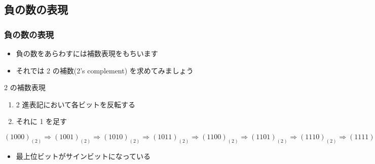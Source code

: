 \subsection{負の数の表現}
\begin{frame}[shrink]
\frametitle{負の数の表現}
  \begin{itemize}
\item 負の数をあらわすには補数表現をもちいます
\item それでは 2 の補数(2's complement) を求めてみましょう
  \end{itemize}
  \begin{block}{2 の補数表現}
    \begin{enumerate}
\item 2 進表記において各ビットを反転する
\item それに 1 を足す
    \end{enumerate}
  \end{block}
  \begin{center}
    \begin{example}
\((1000)_{(2)}\Rightarrow(1001)_{(2)}\Rightarrow(1010)_{(2)}\Rightarrow (1011)_{(2)}\Rightarrow (1100)_{(2)}
\Rightarrow(1101)_{(2)}\Rightarrow(1110)_{(2)}\Rightarrow(1111)_{(2)}
\Rightarrow(0000)_{(2)}\Rightarrow(0001)_{(2)}\Rightarrow(0010)_{(2)}\Rightarrow(0011)_{(2)}
\Rightarrow(0100)_{(2)}\Rightarrow(0101)_{(2)}\Rightarrow(0110)_{(2)}\Rightarrow(0111)_{(2)}\Rightarrow(1000)_{(2)}\)\\
      \begin{itemize}
\item 最上位ビットがサインビットになっている
      \end{itemize}
    \end{example}
  \end{center}
\end{frame}
